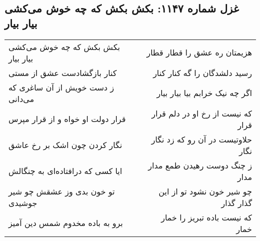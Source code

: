 \begin{center}
\section*{غزل شماره ۱۱۴۷: بکش بکش که چه خوش می‌کشی بیار بیار}
\label{sec:1147}
\begin{longtable}{l p{0.5cm} r}
بکش بکش که چه خوش می‌کشی بیار بیار
&&
هزیمتان ره عشق را قطار قطار
\\
کنار بازگشادست عشق از مستی
&&
رسید دلشدگان را گه کنار کنار
\\
ز دست خویش از آن ساغری که می‌دانی
&&
اگر چه نیک خرابم بیا بیار بیار
\\
قرار دولت او خواه و از قرار مپرس
&&
که نیست از رخ او در دلم قرار قرار
\\
نگار کردن چون اشک بر رخ عاشق
&&
حلاوتیست در آن رو که زد نگار نگار
\\
ایا کسی که درافتاده‌ای به چنگالش
&&
ز چنگ دوست رهیدن طمع مدار مدار
\\
تو خون بدی وز عشقش چو شیر جوشیدی
&&
چو شیر خون نشود تو از این گذار گذار
\\
برو به باده مخدوم شمس دین آمیز
&&
که نیست باده تبریز را خمار خمار
\\
\end{longtable}
\end{center}
